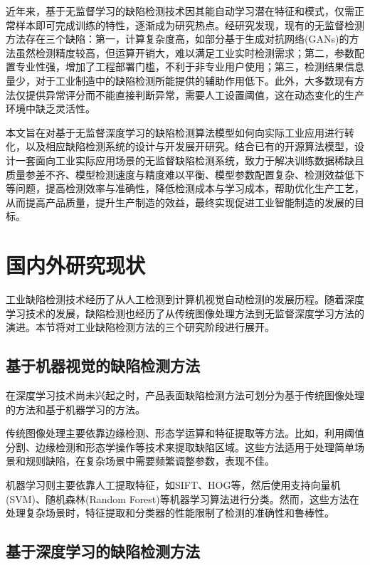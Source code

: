 \documentclass[
  ]{njuthesis}
\begin{document}
近年来，基于无监督学习的缺陷检测技术因其能自动学习潜在特征和模式，仅需正常样本即可完成训练的特性，逐渐成为研究热点。经研究发现，现有的无监督检测方法存在三个缺陷：第一，计算复杂度高，如部分基于生成对抗网络(GANs)的方法虽然检测精度较高，但运算开销大，难以满足工业实时检测需求；第二，参数配置专业性强，增加了工程部署门槛，不利于非专业用户使用；第三，检测结果信息量少，对于工业制造中的缺陷检测所能提供的辅助作用低下。此外，大多数现有方法仅提供异常评分而不能直接判断异常，需要人工设置阈值，这在动态变化的生产环境中缺乏灵活性。

本文旨在对基于无监督深度学习的缺陷检测算法模型如何向实际工业应用进行转化，以及相应缺陷检测系统的设计与开发展开研究。结合已有的开源算法模型，设计一套面向工业实际应用场景的无监督缺陷检测系统，致力于解决训练数据稀缺且质量参差不齐、模型检测速度与精度难以平衡、模型参数配置复杂、检测效益低下等问题，提高检测效率与准确性，降低检测成本与学习成本，帮助优化生产工艺，从而提高产品质量，提升生产制造的效益，最终实现促进工业智能制造的发展的目标。

\section{国内外研究现状}

工业缺陷检测技术经历了从人工检测到计算机视觉自动检测的发展历程。随着深度学习技术的发展，缺陷检测也经历了从传统图像处理方法到无监督深度学习方法的演进。本节将对工业缺陷检测方法的三个研究阶段进行展开。

\subsection{基于机器视觉的缺陷检测方法}

在深度学习技术尚未兴起之时，产品表面缺陷检测方法可划分为基于传统图像处理的方法和基于机器学习的方法。

传统图像处理主要依靠边缘检测、形态学运算和特征提取等方法。比如，利用阈值分割、边缘检测和形态学操作等技术来提取缺陷区域。这些方法适用于处理简单场景和规则缺陷，在复杂场景中需要频繁调整参数，表现不佳。

机器学习则主要依靠人工提取特征，如SIFT、HOG等，然后使用支持向量机(SVM)、随机森林(Random Forest)等机器学习算法进行分类。然而，这些方法在处理复杂场景时，特征提取和分类器的性能限制了检测的准确性和鲁棒性。

\subsection{基于深度学习的缺陷检测方法}
\end{document}
